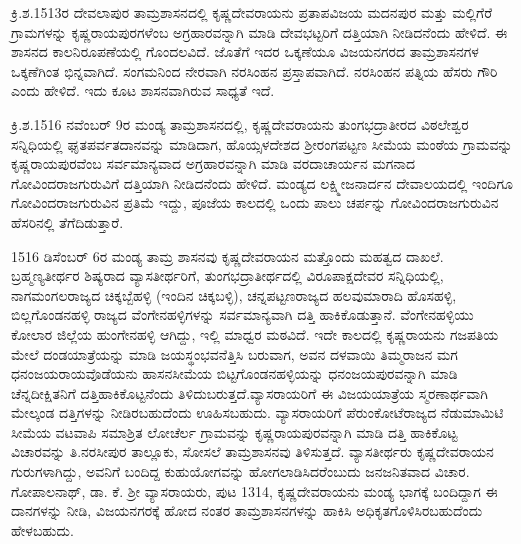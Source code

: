 ಕ್ರಿ.ಶ.1513ರ ದೇವಲಾಪುರ ತಾಮ್ರಶಾಸನದಲ್ಲಿ ಕೃಷ್ಣದೇವರಾಯನು ಪ್ರತಾಪವಿಜಯ ಮದನಪುರ ಮತ್ತು ಮಲ್ಲಿಗೆರೆ ಗ್ರಾಮಗಳನ್ನು ಕೃಷ್ಣರಾಯಪುರಗಳೆಂಬ ಅಗ್ರಹಾರವನ್ನಾಗಿ ಮಾಡಿ ದೇವಭಟ್ಟರಿಗೆ ದತ್ತಿಯಾಗಿ ನೀಡಿದನೆಂದು ಹೇಳಿದೆ. ಈ ಶಾಸನದ ಕಾಲನಿರೂಪಣೆಯಲ್ಲಿ ಗೊಂದಲವಿದೆ. ಜೊತೆಗೆ ಇದರ ಒಕ್ಕಣೆಯೂ ವಿಜಯನಗರದ ತಾಮ್ರಶಾಸನಗಳ ಒಕ್ಕಣೆಗಿಂತ ಭಿನ್ನವಾಗಿದೆ. ಸಂಗಮನಿಂದ ನೇರವಾಗಿ ನರಸಿಂಹನ ಪ್ರಸ್ತಾಪವಾಗಿದೆ. ನರಸಿಂಹನ ಪತ್ನಿಯ ಹೆಸರು ಗೌರಿ ಎಂದು ಹೇಳಿದೆ. ಇದು ಕೂಟ ಶಾಸನವಾಗಿರುವ ಸಾಧ್ಯತೆ ಇದೆ.

ಕ್ರಿ.ಶ.1516 ನವೆಂಬರ್​ 9ರ ಮಂಡ್ಯ ತಾಮ್ರಶಾಸನದಲ್ಲಿ, ಕೃಷ್ಣದೇವರಾಯನು ತುಂಗಭದ್ರಾತೀರದ ವಿಠಲೇಶ್ವರ ಸನ್ನಿಧಿಯಲ್ಲಿ ಘೃತಪರ್ವತದಾನವನ್ನು ಮಾಡಿದಾಗ, ಹೊಯ್ಸಳದೇಶದ ಶ‍್ರೀರಂಗಪಟ್ಟಣ ಸೀಮೆಯ ಮಂಠೆಯ ಗ್ರಾಮವನ್ನು ಕೃಷ್ಣರಾಯಪುರವೆಂಬ ಸರ್ವಮಾನ್ಯವಾದ ಅಗ್ರಹಾರವನ್ನಾಗಿ ಮಾಡಿ ವರದಾಚಾರ್ಯನ ಮಗನಾದ ಗೋವಿಂದರಾಜಗುರುವಿಗೆ ದತ್ತಿಯಾಗಿ ನೀಡಿದನೆಂದು ಹೇಳಿದೆ. ಮಂಡ್ಯದ ಲಕ್ಷ್ಮೀಜನಾರ್ದನ ದೇವಾಲಯದಲ್ಲಿ ಇಂದಿಗೂ ಗೋವಿಂದರಾಜಗುರುವಿನ ಪ್ರತಿಮೆ ಇದ್ದು, ಪೂಜೆಯ ಕಾಲದಲ್ಲಿ ಒಂದು ಪಾಲು ಚರ್ಪನ್ನು ಗೋವಿಂದರಾಜಗುರುವಿನ ಹೆಸರಿನಲ್ಲಿ ತೆಗೆದಿಡುತ್ತಾರೆ.

1516 ಡಿಸೆಂಬರ್​ 6ರ ಮಂಡ್ಯ ತಾಮ್ರ ಶಾಸನವು ಕೃಷ್ಣದೇವರಾಯನ ಮತ್ತೊಂದು ಮಹತ್ವದ ದಾಖಲೆ. ಬ್ರಹ್ಮಣ್ಯತೀರ್ಥರ ಶಿಷ್ಯರಾದ ವ್ಯಾಸತೀರ್ಥರಿಗೆ, ತುಂಗಭದ್ರಾತೀರ್ಥದಲ್ಲಿ ವಿರೂಪಾಕ್ಷದೇವರ ಸನ್ನಿಧಿಯಲ್ಲಿ, ನಾಗಮಂಗಲ\-ರಾಜ್ಯದ ಚಿಕ್ಕಬ್ಬೆಹಳ್ಳಿ (ಇಂದಿನ ಚಿಕ್ಕಬಳ್ಳಿ), ಚನ್ನಪಟ್ಟಣರಾಜ್ಯದ ಹಲವುಮಾರಾದಿ ಹೊಸಹಳ್ಳಿ, ಬಿಲ್ಲಗೊಂಡನಹಳ್ಳಿ ರಾಜ್ಯದ ವೆಂಗೇನಹಳ್ಳಿಗಳನ್ನು ಸರ್ವಮಾನ್ಯವಾಗಿ ದತ್ತಿ ಹಾಕಿಕೊಡುತ್ತಾನೆ. ವೆಂಗೇನಹಳ್ಳಿಯು ಕೋಲಾರ ಜಿಲ್ಲೆಯ ಹುಂಗೇನಹಳ್ಳಿ ಆಗಿದ್ದು, ಇಲ್ಲಿ ಮಾಧ್ವರ ಮಠವಿದೆ. ಇದೇ ಕಾಲದಲ್ಲಿ ಕೃಷ್ಣರಾಯನು ಗಜಪತಿಯ ಮೇಲೆ ದಂಡಯಾತ್ರೆಯನ್ನು ಮಾಡಿ ಜಯಸ್ಥಂಭವನೆತ್ತಿಸಿ ಬರುವಾಗ, ಅವನ ದಳವಾಯಿ ತಿಮ್ಮರಾಜನ ಮಗ ಧನಂಜಯರಾಯವೊಡೆಯನು ಹಾಸನಸೀಮೆಯ ಬಿಟ್ಟಗೊಂಡನಹಳ್ಳಿಯನ್ನು ಧನಂಜಯಪುರವನ್ನಾಗಿ ಮಾಡಿ ಚೆನ್ನದೀಕ್ಷಿತನಿಗೆ ದತ್ತಿಹಾಕಿಕೊಟ್ಟನೆಂದು ತಿಳಿದುಬರುತ್ತದೆ.\break ವ್ಯಾಸರಾಯರಿಗೆ ಈ ವಿಜಯಯಾತ್ರೆಯ ಸ್ಮರಣಾರ್ಥವಾಗಿ ಮೇಲ್ಕಂಡ ದತ್ತಿಗಳನ್ನು ನೀಡಿರಬಹುದೆಂದು ಊಹಿಸಬಹುದು. ವ್ಯಾಸರಾಯರಿಗೆ ಪೆರುಂಕೋಟೆರಾಜ್ಯದ ನೆಡುಮಾಮಿಟಿ ಸೀಮೆಯ ವಟವಾಪಿ ಸಮಾಶ್ರಿತ ಲೋಚೆರ್ಲ ಗ್ರಾಮವನ್ನು ಕೃಷ್ಣರಾಯಪುರವನ್ನಾಗಿ ಮಾಡಿ ದತ್ತಿ ಹಾಕಿಕೊಟ್ಟ ವಿಚಾರವನ್ನು ತಿ.ನರಸೀಪುರ ತಾಲ್ಲೂಕು, ಸೋಸಲೆ ತಾಮ್ರಶಾಸನವು ತಿಳಿಸುತ್ತದೆ. ವ್ಯಾಸತೀರ್ಥರು ಕೃಷ್ಣದೇವರಾಯನ ಗುರುಗಳಾಗಿದ್ದು, ಅವನಿಗೆ ಬಂದಿದ್ದ ಕುಹುಯೋಗವನ್ನು ಹೋಗಲಾಡಿ\-ಸಿದರೆಂಬುದು ಜನಜನಿತವಾದ ವಿಚಾರ. ಗೋಪಾಲನಾಥ್, ಡಾ. ಕೆ. ಶ‍್ರೀ ವ್ಯಾಸರಾಯರು, ಪುಟ 13\enginline{-}14, ಕೃಷ್ಣದೇವರಾಯನು ಮಂಡ್ಯ ಭಾಗಕ್ಕೆ ಬಂದಿದ್ದಾಗ ಈ ದಾನಗಳನ್ನು ನೀಡಿ, ವಿಜಯನಗರಕ್ಕೆ ಹೋದ ನಂತರ ತಾಮ್ರಶಾಸನಗಳನ್ನು ಹಾಕಿಸಿ ಅಧಿಕೃತಗೊಳಿಸಿರ\-ಬಹುದೆಂದು ಹೇಳಬಹುದು.

